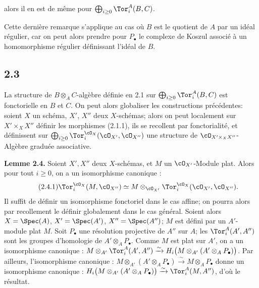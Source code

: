 alors il en est de même pour \(\bigoplus_{i\ge0}\Tor_i^A(B,C)\).

Cette dernière remarque s'applique au cas où \(B\) est le quotient de \(A\) par un idéal régulier, car on peut alors prendre pour \(P_\bullet\) le complexe de Koszul associé à un homomorphisme régulier définissant l'idéal de \(B\).

\subsection*{2.3}
La structure de \(B\otimes_A C\)-algèbre définie en 2.1 sur \(\bigoplus_{i\ge0}\Tor_i^A(B,C)\) est fonctorielle en \(B\) et \(C\). On peut alors globaliser les constructions précédentes: soient \(X\) un schéma, \(X'\), \(X''\) deux \(X\)-schémas; alors on peut localement sur \(X'\times_X X''\) définir les morphismes (2.1.1), ils se recollent par fonctorialité, et définissent sur \(\bigoplus_{i\ge0}\Tor_i^{\cO_X}(\cO_{X'},\cO_{X''})\) une structure de \(\cO_{X'\times_X X''}\)-Algèbre graduée associative.

\textbf{Lemme 2.4.} Soient \(X',X''\) deux \(X\)-schémas, et \(M\) un \(\cO_{X'}\)-Module plat. Alors pour tout \(i\ge0\), on a un isomorphisme canonique :
\begin{equation}\tag{2.4.1}
\Tor_i^{\cO_X}(M,\cO_{X''})\simeq
M\otimes_{\cO_{X'}}\Tor_i^{\cO_X}(\cO_{X'},\cO_{X''}).
\end{equation}
Il suffit de définir un isomorphisme fonctoriel dans le cas affine; on pourra alors par recollement le définir globalement dans le cas général. Soient alors \(X=\Spec(A)\), \(X'=\Spec(A')\), \(X''=\Spec(A'')\); \(M\) est défini par un \(A'\)-module plat \(M\). Soit \(P_\bullet\) une résolution projective de \(A''\) sur \(A\); les \(\Tor_i^A(A',A'')\) sont les groupes d'homologie de \(A'\otimes_A P_\bullet\). Comme \(M\) est plat sur \(A'\), on a un isomorphisme canonique : \(M\otimes_{A'}\Tor_i^A(A',A'')\xrightarrow{\sim}H_i\bigl(M\otimes_{A'}(A'\otimes_A P_\bullet)\bigr)\). Par ailleurs, l'isomorphisme canonique : \(M\otimes_{A'}(A'\otimes_A P_\bullet)\xrightarrow{\sim}M\otimes_A P_\bullet\) donne un isomorphisme canonique : \(H_i\bigl(M\otimes_{A'}(A'\otimes_A P_\bullet)\bigr)\xrightarrow{\sim}\Tor_i^A(M,A'')\), d'où le résultat.

